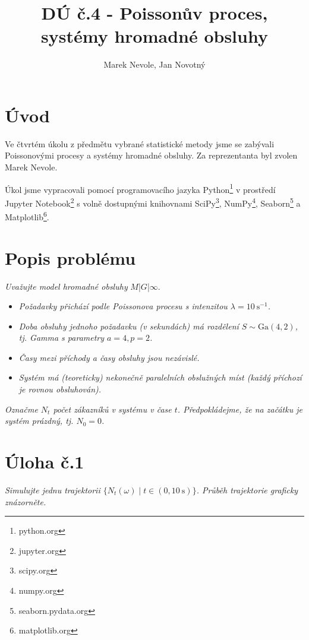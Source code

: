 \documentclass[czech]{mvi-report}
\title{DÚ č.4 - Poissonův proces, systémy hromadné obsluhy}
\author{Marek Nevole, Jan Novotný}
\affiliation{ČVUT - FIT}
\begin{document}
\maketitle

\section{Úvod}
Ve čtvrtém úkolu z předmětu vybrané statistické metody jsme se zabývali Poissonovými procesy a systémy hromadné obsluhy. Za reprezentanta byl zvolen Marek Nevole.

Úkol jsme vypracovali pomocí programovacího jazyka Python\footnote{python.org} v prostředí Jupyter Notebook\footnote{jupyter.org} s volně dostupnými knihovnami SciPy\footnote{scipy.org}, NumPy\footnote{numpy.org}, Seaborn\footnote{seaborn.pydata.org} a Matplotlib\footnote{matplotlib.org}.

\section{Popis problému}
\textit{Uvažujte model hromadné obsluhy} $M$|$G$|$\infty$.
\begin{itemize}
  \item \textit{Požadavky přichází podle Poissonova procesu s intenzitou $\lambda = 10~\mathrm{s}^{-1}$.}
  \item \textit{Doba obsluhy jednoho požadavku (v sekundách) má rozdělení $S\sim\mathrm{Ga}(4,2)$, tj. Gamma s parametry $a = 4, p = 2$.}
  \item \textit{Časy mezi příchody a časy obsluhy jsou nezávislé.}
  \item \textit{Systém má (teoreticky) nekonečně paralelních obslužných míst (každý příchozí je rovnou obsluhován).}
\end{itemize}
\textit{Označme $N_t$ počet zákazníků v systému v čase $t$. Předpokládejme, že na začátku je systém prázdný, tj. $N_0 = 0$.}


\section{Úloha č.1}
\textit{Simulujte jednu trajektorii $\{N_t(\omega) \mid t\in(0,10~\mathrm{s})\}$. Průběh trajektorie graficky znázorněte.}\\
\end{document}
